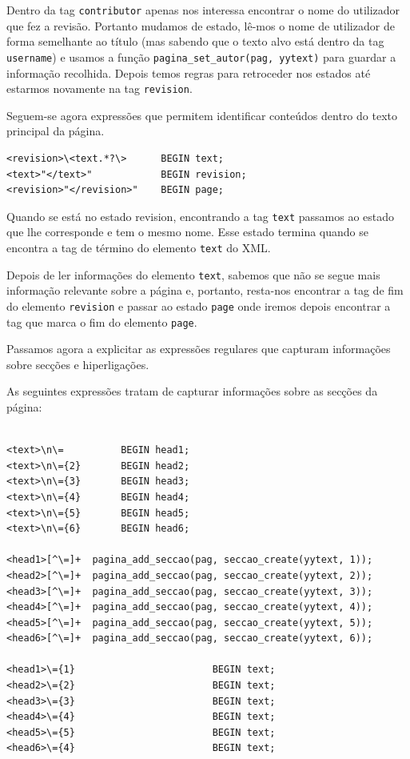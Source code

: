 \documentclass[11pt, a4paper, oneside]{article}
\begin{document}
Dentro da tag \texttt{contributor} apenas nos interessa encontrar o nome do utilizador que fez a revisão. Portanto mudamos de estado, lê-mos o nome de utilizador de forma semelhante ao título (mas sabendo que o texto alvo está dentro da tag \texttt{username}) e usamos a função \texttt{pagina\_set\_autor(pag, yytext)} para guardar a informação recolhida. Depois temos regras para retroceder nos estados até estarmos novamente na tag \texttt{revision}.


Seguem-se agora expressões que permitem identificar conteúdos dentro do texto principal da página.

\begin{verbatim}
<revision>\<text.*?\>      BEGIN text;
<text>"</text>"            BEGIN revision;
<revision>"</revision>"    BEGIN page;
\end{verbatim}

Quando se está no estado revision, encontrando a tag \texttt{text} passamos ao estado que lhe corresponde e tem o mesmo nome. Esse estado termina quando se encontra a tag de término do elemento \texttt{text} do XML.

Depois de ler informações do elemento \texttt{text}, sabemos que não se segue mais informação relevante sobre a página e, portanto, resta-nos encontrar a tag de fim do elemento \texttt{revision} e passar ao estado \texttt{page} onde iremos depois encontrar a tag que marca o fim do elemento \texttt{page}.

Passamos agora a explicitar as expressões regulares que capturam informações sobre secções e hiperligações.


As seguintes expressões tratam de capturar informações sobre as secções da página:

\begin{verbatim}

<text>\n\=          BEGIN head1;
<text>\n\={2}       BEGIN head2;
<text>\n\={3}       BEGIN head3;
<text>\n\={4}       BEGIN head4;
<text>\n\={5}       BEGIN head5;
<text>\n\={6}       BEGIN head6;

<head1>[^\=]+  pagina_add_seccao(pag, seccao_create(yytext, 1));
<head2>[^\=]+  pagina_add_seccao(pag, seccao_create(yytext, 2));
<head3>[^\=]+  pagina_add_seccao(pag, seccao_create(yytext, 3));
<head4>[^\=]+  pagina_add_seccao(pag, seccao_create(yytext, 4));
<head5>[^\=]+  pagina_add_seccao(pag, seccao_create(yytext, 5));
<head6>[^\=]+  pagina_add_seccao(pag, seccao_create(yytext, 6));

<head1>\={1}                        BEGIN text;
<head2>\={2}                        BEGIN text;
<head3>\={3}                        BEGIN text;
<head4>\={4}                        BEGIN text;
<head5>\={5}                        BEGIN text;
<head6>\={4}                        BEGIN text;
\end{verbatim}
\end{document}
